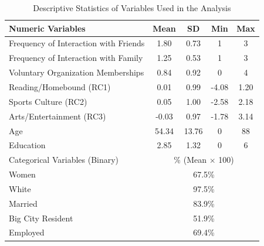 \begin{table}[htbp]
\centering
\caption{Descriptive Statistics of Variables Used in the Analysis}
\label{tab:descriptives}
\begin{tabular}{l c c c c}
\toprule
Numeric Variables & Mean & SD & Min & Max \\
\midrule
Frequency of Interaction with Friends & 1.80 & 0.73 & 1 & 3 \\
Frequency of Interaction with Family & 1.25 & 0.53 & 1 & 3 \\
Voluntary Organization Memberships & 0.84 & 0.92 & 0 & 4 \\
Reading/Homebound (RC1) & 0.01 & 0.99 & -4.08 & 1.20 \\
Sports Culture (RC2) & 0.05 & 1.00 & -2.58 & 2.18 \\
Arts/Entertainment (RC3) & -0.03 & 0.97 & -1.78 & 3.14 \\
Age & 54.34 & 13.76 & 0 & 88 \\
Education & 2.85 & 1.32 & 0 & 6 \\
\midrule
Categorical Variables (Binary) & \multicolumn{4}{c}{\% (Mean $\times$ 100)} \\
\midrule
Women & \multicolumn{4}{c}{67.5\%} \\
White & \multicolumn{4}{c}{97.5\%} \\
Married & \multicolumn{4}{c}{83.9\%} \\
Big City Resident & \multicolumn{4}{c}{51.9\%} \\
Employed & \multicolumn{4}{c}{69.4\%} \\
\bottomrule
\end{tabular}
\end{table}

